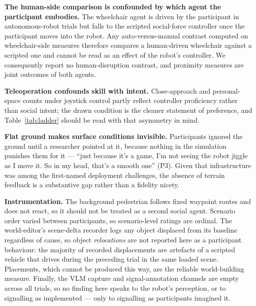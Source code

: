 \textbf{The human-side comparison is confounded by which agent the
participant embodies.} The wheelchair agent is driven by the
participant in autonomous-robot trials but falls to the scripted
social-force controller once the participant moves into the robot. Any
auto-versus-manual contrast computed on wheelchair-side measures
therefore compares a human-driven wheelchair against a scripted one and
cannot be read as an effect of the robot's controller. We consequently
report no human-disruption contrast, and proximity measures are joint
outcomes of both agents.

\textbf{Teleoperation confounds skill with intent.} Close-approach and
personal-space counts under joystick control partly reflect controller
proficiency rather than social intent; the drawn condition is the
cleaner statement of preference, and Table~\ref{tab:ladder} should be
read with that asymmetry in mind.

\textbf{Flat ground makes surface conditions invisible.} Participants
ignored the ground until a researcher pointed at it, because nothing in
the simulation punishes them for it --- ``just because it's a game, I'm
not seeing the robot jiggle as I move it. So in my head, that's a
smooth one'' (P3). Given that infrastructure was among the
first-named deployment challenges, the absence of terrain feedback is a
substantive gap rather than a fidelity nicety.

\textbf{Instrumentation.} The background pedestrian follows fixed
waypoint routes and does not react, so it should not be treated as a
second social agent. Scenario order varied between participants, so
scenario-level ratings are ordinal. The world-editor's scene-delta
recorder logs any object displaced from its baseline regardless of
cause, so object \emph{relocations} are not reported here as a
participant behaviour: the majority of recorded displacements are
artefacts of a scripted vehicle that drives during the preceding trial
in the same loaded scene. Placements, which cannot be produced this
way, are the reliable world-building measure. Finally, the VLM capture
and signal-annotation channels are empty across all trials, so no
finding here speaks to the robot's perception, or to signalling as
implemented --- only to signalling as participants imagined it.
